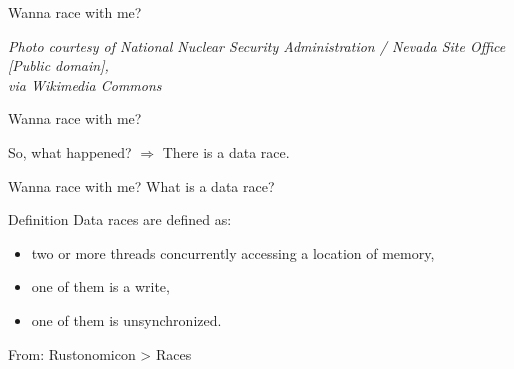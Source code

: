\documentclass{beamer}
\begin{document}
\begin{frame}{Wanna race with me?}
	\begin{center}
	\end{center}
	\raggedleft
	\tiny{\textit{Photo courtesy of National Nuclear Security Administration
	/ Nevada Site Office [Public domain],\\ via Wikimedia Commons}}
\end{frame}


\begin{frame}{Wanna race with me?}
	\begin{center}
		So, what happened?
		\vfill\pause
		$\Rightarrow$ There is a data race.
	\end{center}	
\end{frame}


\begin{frame}{Wanna race with me?}
	What is a data race?
	\begin{block}{Definition}
	Data races are defined as:
	\begin{itemize}
		\item two or more threads concurrently accessing a location of memory,
		\item one of them is a write,
		\item one of them is unsynchronized.
	\end{itemize}
	\raggedleft From: Rustonomicon > Races
	\end{block}
	\vfill
\end{frame}

\end{document}
